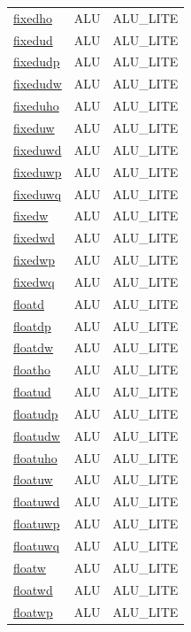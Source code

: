 \begin{small}
\begin{longtable}[l]{l l l}
\hyperlink{lvx.fixedho}{fixedho} & ALU & ALU\_LITE \\ 
\hyperlink{lvx.fixedud}{fixedud} & ALU & ALU\_LITE \\ 
\hyperlink{lvx.fixedudp}{fixedudp} & ALU & ALU\_LITE \\ 
\hyperlink{lvx.fixedudw}{fixedudw} & ALU & ALU\_LITE \\ 
\hyperlink{lvx.fixeduho}{fixeduho} & ALU & ALU\_LITE \\ 
\hyperlink{lvx.fixeduw}{fixeduw} & ALU & ALU\_LITE \\ 
\hyperlink{lvx.fixeduwd}{fixeduwd} & ALU & ALU\_LITE \\ 
\hyperlink{lvx.fixeduwp}{fixeduwp} & ALU & ALU\_LITE \\ 
\hyperlink{lvx.fixeduwq}{fixeduwq} & ALU & ALU\_LITE \\ 
\hyperlink{lvx.fixedw}{fixedw} & ALU & ALU\_LITE \\ 
\hyperlink{lvx.fixedwd}{fixedwd} & ALU & ALU\_LITE \\ 
\hyperlink{lvx.fixedwp}{fixedwp} & ALU & ALU\_LITE \\ 
\hyperlink{lvx.fixedwq}{fixedwq} & ALU & ALU\_LITE \\ 
\hyperlink{lvx.floatd}{floatd} & ALU & ALU\_LITE \\ 
\hyperlink{lvx.floatdp}{floatdp} & ALU & ALU\_LITE \\ 
\hyperlink{lvx.floatdw}{floatdw} & ALU & ALU\_LITE \\ 
\hyperlink{lvx.floatho}{floatho} & ALU & ALU\_LITE \\ 
\hyperlink{lvx.floatud}{floatud} & ALU & ALU\_LITE \\ 
\hyperlink{lvx.floatudp}{floatudp} & ALU & ALU\_LITE \\ 
\hyperlink{lvx.floatudw}{floatudw} & ALU & ALU\_LITE \\ 
\hyperlink{lvx.floatuho}{floatuho} & ALU & ALU\_LITE \\ 
\hyperlink{lvx.floatuw}{floatuw} & ALU & ALU\_LITE \\ 
\hyperlink{lvx.floatuwd}{floatuwd} & ALU & ALU\_LITE \\ 
\hyperlink{lvx.floatuwp}{floatuwp} & ALU & ALU\_LITE \\ 
\hyperlink{lvx.floatuwq}{floatuwq} & ALU & ALU\_LITE \\ 
\hyperlink{lvx.floatw}{floatw} & ALU & ALU\_LITE \\ 
\hyperlink{lvx.floatwd}{floatwd} & ALU & ALU\_LITE \\ 
\hyperlink{lvx.floatwp}{floatwp} & ALU & ALU\_LITE \\ 

\end{longtable}
\end{small}
